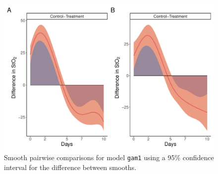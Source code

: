 \documentclass[
]{article}
\newcommand{\passthrough}[1]{#1}
\begin{document}
\begin{figure}[H]

{\centering \includegraphics[width=0.75\linewidth,]{Full_document_files/figure-latex/plot-pairwise-comp-Appendix-1} 

}

\caption{Smooth pairwise comparisons for model \passthrough{\lstinline!gam1!} using a 95\% confidence interval for the difference between smooths.}\label{fig:plot-pairwise-comp-Appendix}
\end{figure}
\end{document}

